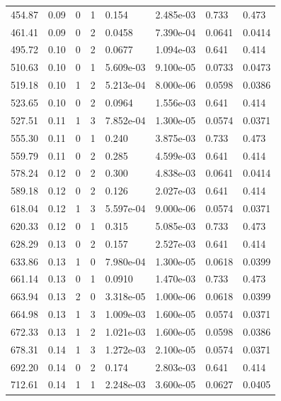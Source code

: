 \documentclass[preview]{standalone}
\begin{document}
{{{\begin{tabular}{L{1.2cm}C{1.2cm} C{0.3cm}C{0.5cm} C{1.4cm}C{1.4cm} C{1.4cm}C{1.4cm}}
  454.87  &  0.09  & 0     &  1 &  0.154  & 2.485e-03  & 0.733 &  0.473   \\ 
  461.41  &  0.09  & 0     &  2 &  0.0458  & 7.390e-04  & 0.0641 &  0.0414   \\ 
  495.72  &  0.10  & 0     &  2 &  0.0677  & 1.094e-03  & 0.641 &  0.414   \\ 
  510.63  &  0.10  & 0     &  1 &  5.609e-03  & 9.100e-05  & 0.0733 &  0.0473   \\ 
  519.18  &  0.10  & 1     &  2 &  5.213e-04  & 8.000e-06  & 0.0598 &  0.0386   \\ 
  523.65  &  0.10  & 0     &  2 &  0.0964  & 1.556e-03  & 0.641 &  0.414   \\ 
  527.51  &  0.11  & 1     &  3 &  7.852e-04  & 1.300e-05  & 0.0574 &  0.0371   \\ 
  555.30  &  0.11  & 0     &  1 &  0.240  & 3.875e-03  & 0.733 &  0.473   \\ 
  559.79  &  0.11  & 0     &  2 &  0.285  & 4.599e-03  & 0.641 &  0.414   \\ 
  578.24  &  0.12  & 0     &  2 &  0.300  & 4.838e-03  & 0.0641 &  0.0414   \\ 
  589.18  &  0.12  & 0     &  2 &  0.126  & 2.027e-03  & 0.641 &  0.414   \\ 
  618.04  &  0.12  & 1     &  3 &  5.597e-04  & 9.000e-06  & 0.0574 &  0.0371   \\ 
  620.33  &  0.12  & 0     &  1 &  0.315  & 5.085e-03  & 0.733 &  0.473   \\ 
  628.29  &  0.13  & 0     &  2 &  0.157  & 2.527e-03  & 0.641 &  0.414   \\ 
  633.86  &  0.13  & 1     &  0 &  7.980e-04  & 1.300e-05  & 0.0618 &  0.0399   \\ 
  661.14  &  0.13  & 0     &  1 &  0.0910  & 1.470e-03  & 0.733 &  0.473   \\ 
  663.94  &  0.13  & 2     &  0 &  3.318e-05  & 1.000e-06  & 0.0618 &  0.0399   \\ 
  664.98  &  0.13  & 1     &  3 &  1.009e-03  & 1.600e-05  & 0.0574 &  0.0371   \\ 
  672.33  &  0.13  & 1     &  2 &  1.021e-03  & 1.600e-05  & 0.0598 &  0.0386   \\ 
  678.31  &  0.14  & 1     &  3 &  1.272e-03  & 2.100e-05  & 0.0574 &  0.0371   \\ 
  692.20  &  0.14  & 0     &  2 &  0.174  & 2.803e-03  & 0.641 &  0.414   \\ 
  712.61  &  0.14  & 1     &  1 &  2.248e-03  & 3.600e-05  & 0.0627 &  0.0405   \\ 

\end{tabular}}}}
\end{document}
